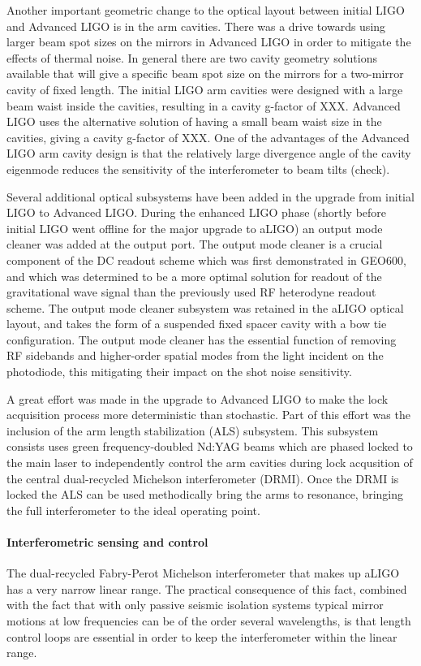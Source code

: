 Another important geometric change to the optical layout between initial LIGO and Advanced LIGO is 
in the arm cavities. There was a drive towards using larger beam spot sizes on the mirrors in Advanced 
LIGO in order to mitigate the effects of thermal noise. In general there are two cavity geometry solutions available 
that will give a specific beam spot size on the mirrors for a two-mirror cavity of fixed length. The initial LIGO 
arm cavities were designed with a large beam waist inside the cavities, resulting in a cavity g-factor of XXX. 
Advanced LIGO uses the alternative solution of having a small beam waist size in the cavities, giving a cavity g-factor of XXX. 
One of the advantages of the Advanced LIGO arm cavity design is that the relatively large divergence angle of the cavity 
eigenmode reduces the sensitivity of the interferometer to beam tilts (check). 

Several additional optical subsystems have been added in the upgrade from initial LIGO to Advanced LIGO. 
During the enhanced LIGO phase (shortly before initial LIGO went offline for the major upgrade to aLIGO) an output
mode cleaner was added at the output port. The output mode cleaner is a crucial component of the DC readout 
scheme which was first demonstrated in GEO600, and which was determined to be a more optimal solution for 
readout of the gravitational wave signal than the previously used RF heterodyne readout scheme. The output mode 
cleaner subsystem was retained in the aLIGO optical layout, and takes the form of a suspended fixed spacer cavity 
with a bow tie configuration. The output mode cleaner has the essential function of removing RF sidebands and higher-order 
spatial modes from the light incident on the photodiode, this mitigating their impact on the shot noise sensitivity. 

A great effort was made in the upgrade to Advanced LIGO to make the lock acquisition process more deterministic than 
stochastic. Part of this effort was the inclusion of the arm length stabilization (ALS) subsystem. This subsystem consists uses 
green frequency-doubled Nd:YAG beams which are phased locked to the main laser to independently control the arm cavities during 
lock acqusition of the central dual-recycled Michelson interferometer (DRMI). Once the DRMI is locked the ALS can be used 
methodically bring the arms to resonance, bringing the full interferometer to the ideal operating point.

\paragraph*{Interferometric sensing and control}
The dual-recycled Fabry-Perot Michelson interferometer that makes up aLIGO has a very narrow linear range. 
The practical consequence of this fact, combined with the fact that with only passive seismic isolation systems typical 
mirror motions at low frequencies can be of the order several wavelengths, is that length control loops are essential in order 
to keep the interferometer within the linear range. 

